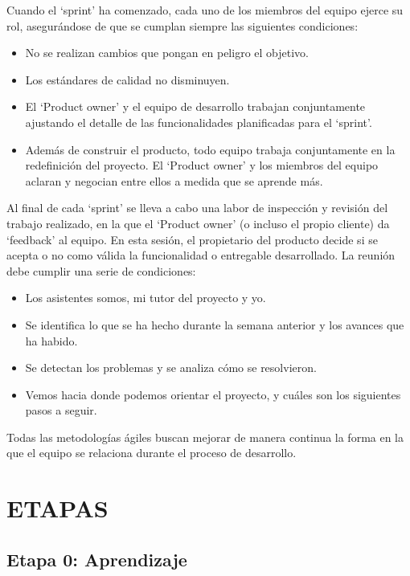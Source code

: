 \documentclass[a4paper, 12pt]{book}
\begin{document}
Cuando el ‘sprint’ ha comenzado, cada uno de los miembros del equipo ejerce su rol, asegurándose de que se cumplan siempre las siguientes condiciones:
\begin{itemize}
\newpage
    \item No se realizan cambios que pongan en peligro el objetivo.
    \item Los estándares de calidad no disminuyen.
    \item El ‘Product owner’ y el equipo de desarrollo trabajan conjuntamente ajustando el detalle de las funcionalidades planificadas para el ‘sprint’.
    \item Además de construir el producto, todo equipo trabaja conjuntamente en la redefinición del proyecto. El ‘Product owner’ y los miembros del equipo aclaran y negocian entre ellos a medida que se aprende más.

\end{itemize}

Al final de cada ‘sprint’ se lleva a cabo una labor de inspección y revisión del trabajo realizado, en la que el ‘Product owner’ (o incluso el propio cliente) da ‘feedback’ al equipo. En esta sesión, el propietario del producto decide si se acepta o no como válida la funcionalidad o entregable desarrollado. La reunión debe cumplir una serie de condiciones:

\begin{itemize}
    \item Los asistentes somos, mi tutor del proyecto y yo.
    \item Se identifica lo que se ha hecho durante la semana anterior y los avances que ha habido.
    \item Se detectan los problemas y se analiza cómo se resolvieron.
    \item Vemos hacia donde podemos orientar el proyecto, y cuáles son los siguientes pasos a seguir.
\end{itemize}
Todas las metodologías ágiles buscan mejorar de manera continua la forma en la que el equipo se relaciona durante el proceso de desarrollo. 


\section{ETAPAS} 
\label{sec:estapas}

\subsection{Etapa 0: Aprendizaje}
\end{document}
